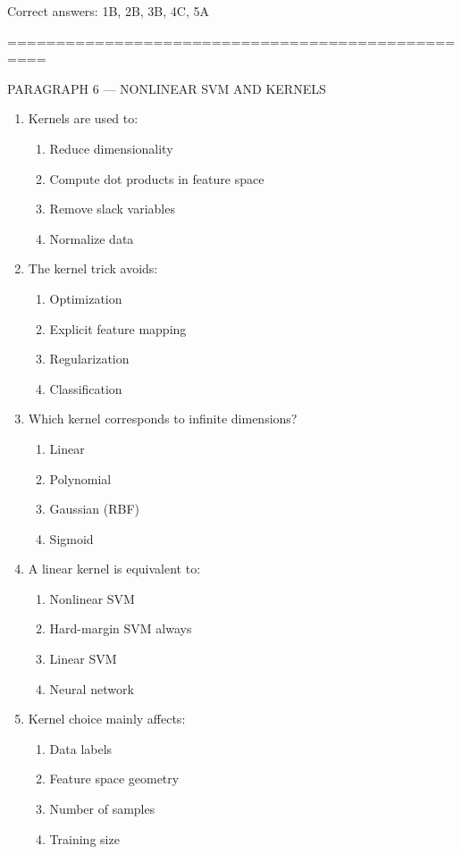 \documentclass{article}
\begin{document}
	Correct answers: 1B, 2B, 3B, 4C, 5A
	
	\bigskip
	==================================================
	
	PARAGRAPH 6 — NONLINEAR SVM AND KERNELS
	
	\begin{enumerate}
		\item Kernels are used to:
		\begin{enumerate}
			\item Reduce dimensionality
			\item Compute dot products in feature space
			\item Remove slack variables
			\item Normalize data
		\end{enumerate}
		
		\item The kernel trick avoids:
		\begin{enumerate}
			\item Optimization
			\item Explicit feature mapping
			\item Regularization
			\item Classification
		\end{enumerate}
		
		\item Which kernel corresponds to infinite dimensions?
		\begin{enumerate}
			\item Linear
			\item Polynomial
			\item Gaussian (RBF)
			\item Sigmoid
		\end{enumerate}
		
		\item A linear kernel is equivalent to:
		\begin{enumerate}
			\item Nonlinear SVM
			\item Hard-margin SVM always
			\item Linear SVM
			\item Neural network
		\end{enumerate}
		
		\item Kernel choice mainly affects:
		\begin{enumerate}
			\item Data labels
			\item Feature space geometry
			\item Number of samples
			\item Training size
		\end{enumerate}
	\end{enumerate}
	
\end{document}
